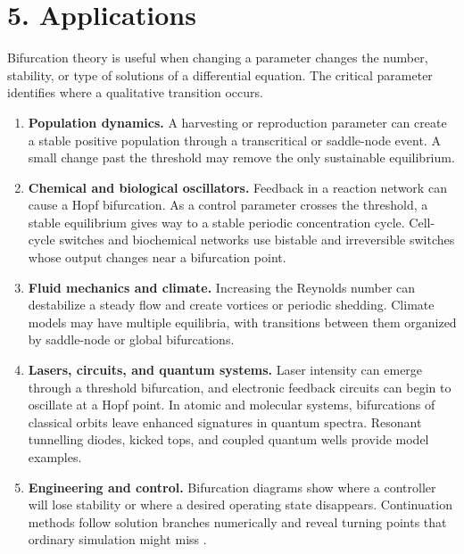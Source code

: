 \section*{5. Applications}
Bifurcation theory is useful when changing a parameter changes the number, stability, or type of solutions of a differential equation. The critical parameter identifies where a qualitative transition occurs.
\begin{enumerate}[leftmargin=*,itemsep=0.35em]
\item \textbf{Population dynamics.} A harvesting or reproduction parameter can create a stable positive population through a transcritical or saddle-node event. A small change past the threshold may remove the only sustainable equilibrium.
\item \textbf{Chemical and biological oscillators.} Feedback in a reaction network can cause a Hopf bifurcation. As a control parameter crosses the threshold, a stable equilibrium gives way to a stable periodic concentration cycle. Cell-cycle switches and biochemical networks use bistable and irreversible switches whose output changes near a bifurcation point.
\item \textbf{Fluid mechanics and climate.} Increasing the Reynolds number can destabilize a steady flow and create vortices or periodic shedding. Climate models may have multiple equilibria, with transitions between them organized by saddle-node or global bifurcations.
\item \textbf{Lasers, circuits, and quantum systems.} Laser intensity can emerge through a threshold bifurcation, and electronic feedback circuits can begin to oscillate at a Hopf point. In atomic and molecular systems, bifurcations of classical orbits leave enhanced signatures in quantum spectra. Resonant tunnelling diodes, kicked tops, and coupled quantum wells provide model examples.
\item \textbf{Engineering and control.} Bifurcation diagrams show where a controller will lose stability or where a desired operating state disappears. Continuation methods follow solution branches numerically and reveal turning points that ordinary simulation might miss \cite{bifurcation_theory_ref2,bifurcation_theory_ref4}.
\end{enumerate}


